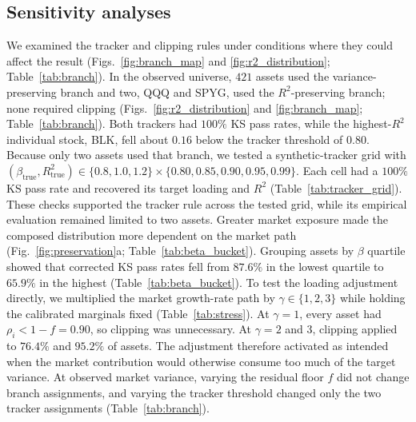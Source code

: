 
\subsection{Sensitivity analyses}

We examined the tracker and clipping rules under conditions where
they could affect the result (Figs.~\ref{fig:branch_map} and
\ref{fig:r2_distribution}; Table~\ref{tab:branch}). In the observed universe, $421$ assets
used the variance-preserving branch and two, QQQ and SPYG, used the
$R^2$-preserving branch; none required clipping
(Figs.~\ref{fig:r2_distribution} and \ref{fig:branch_map};
Table~\ref{tab:branch}). Both trackers had $100\%$ KS pass rates,
while the highest-$R^2$ individual stock, BLK, fell about $0.16$
below the tracker threshold of $0.80$. Because only two assets used
that branch, we tested a synthetic-tracker grid with
$(\beta_{\mathrm{true}},R^2_{\mathrm{true}})\in\{0.8,1.0,1.2\}
\times\{0.80,0.85,0.90,0.95,0.99\}$. Each cell had a $100\%$ KS pass
rate and recovered its target loading and $R^2$
(Table~\ref{tab:tracker_grid}). These checks supported the tracker
rule across the tested grid, while its empirical evaluation remained
limited to two assets.
Greater market exposure made the composed distribution more dependent
on the market path (Fig.~\ref{fig:preservation}a;
Table~\ref{tab:beta_bucket}). Grouping assets by $\beta$ quartile showed that
corrected KS pass rates fell from $87.6\%$ in the lowest quartile
to $65.9\%$ in the highest (Table~\ref{tab:beta_bucket}).
To test the loading adjustment directly, we multiplied the market
growth-rate path by $\gamma\in\{1,2,3\}$ while holding the calibrated
marginals fixed (Table~\ref{tab:stress}). At $\gamma=1$, every
asset had $\rho_i<1-f=0.90$, so clipping was unnecessary.
At $\gamma=2$ and $3$, clipping applied to $76.4\%$ and $95.2\%$
of assets. The adjustment therefore activated as intended when the
market contribution would otherwise consume too much of the target
variance. At observed market variance, varying the residual floor
$f$ did not change branch assignments, and varying the tracker
threshold changed only the two tracker assignments
(Table~\ref{tab:branch}).

